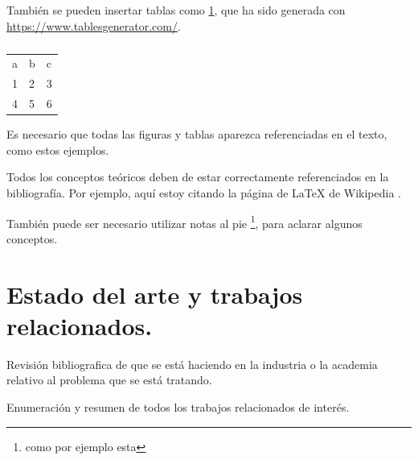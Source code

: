 También se pueden insertar tablas como \ref{tab:my-table}, que ha sido generada con \url{https://www.tablesgenerator.com/}.

\begin{table}[]
\begin{tabular}{lll}
a & b & c \\
1 & 2 & 3 \\
4 & 5 & 6
\end{tabular}
\caption{}
\label{tab:my-table}
\end{table}

Es necesario que todas las figuras y tablas aparezca referenciadas en el texto, como estos ejemplos.

Todos los conceptos teóricos deben de estar correctamente referenciados en la bibliografía. Por ejemplo, aquí estoy citando la página de \LaTeX{} de Wikipedia \cite{wiki:latex}.

También puede ser necesario utilizar notas al pie \footnote{como por ejemplo esta}, para aclarar algunos conceptos.


\section{Estado del arte y trabajos relacionados.}

Revisión bibliografica de que se está haciendo en la industria o la academia relativo al problema que se está tratando.

Enumeración y resumen de todos los trabajos relacionados de interés.